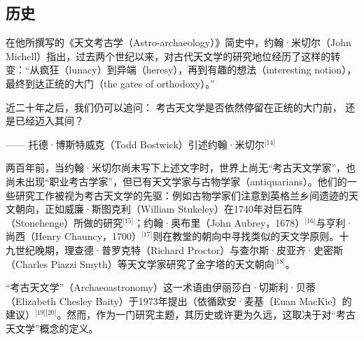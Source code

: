 \subsection{历史}
在他所撰写的《天文考古学（Astro-archaeology）》简史中，约翰·米切尔（John Michell）指出，过去两个世纪以来，对古代天文学的研究地位经历了这样的转变：“从疯狂（lunacy）到异端（heresy），再到有趣的想法（interesting notion），最终到达正统的大门（the gates of orthodoxy）。”  

近二十年之后，我们仍可以追问：  
考古天文学是否依然停留在正统的大门前，  
还是已经迈入其间？  

—— 托德·博斯特威克（Todd Bostwick）引述约翰·米切尔\(^\text{[14]}\)

两百年前，当约翰·米切尔尚未写下上述文字时，世界上尚无“考古天文学家”，也尚未出现“职业考古学家”，但已有天文学家与古物学家（antiquarians）。他们的一些研究工作被视为考古天文学的先驱：例如古物学家们注意到英格兰乡间遗迹的天文朝向，正如威廉·斯图克利（William Stukeley）在1740年对巨石阵（Stonehenge）所做的研究\(^\text{[15]}\)；约翰·奥布里（John Aubrey，1678）\(^\text{[16]}\)与亨利·尚西（Henry Chauncy，1700）\(^\text{[17]}\)则在教堂的朝向中寻找类似的天文学原则。十九世纪晚期，理查德·普罗克特（Richard Proctor）与查尔斯·皮亚齐·史密斯（Charles Piazzi Smyth）等天文学家研究了金字塔的天文朝向\(^\text{[18]}\)。

“考古天文学”（Archaeoastronomy）这一术语由伊丽莎白·切斯利·贝蒂（Elizabeth Chesley Baity）于1973年提出（依循欧安·麦基〔Euan MacKie〕的建议）\(^\text{[19][20]}\)。然而，作为一门研究主题，其历史或许更为久远，这取决于对“考古天文学”概念的定义。  

